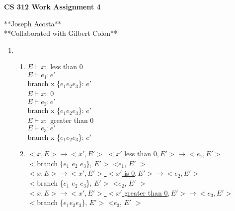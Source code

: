 \documentclass[11pt]{article}
\begin{document}
\begin{center}             %
\begin{LARGE}
{\bf CS 312 Work Assignment 4}
\end{LARGE}
\vskip 0.25cm      %

**Joseph Acosta**\\
**Collaborated with Gilbert Colon**\\
\end{center}

\begin{enumerate}

\item 
\begin{enumerate}
\item $E\vdash x:$ less than 0\\
	  \underline{$E\vdash e_1: e'$}\\
	  branch x \{$e_1 e_2 e_3$\}: $e'$\\
	  
	  $E\vdash x:$ 0\\
	  \underline{$E\vdash e_2: e'$}\\
	  branch x \{$e_1 e_2 e_3$\}: $e'$\\
	  
	  $E\vdash x:$ greater than 0\\
	  \underline{$E\vdash e_3: e'$}\\
	  branch x \{$e_1 e_2 e_3$\}: $e'$\\
	  
\item \underline{$<x,E> \to <x',E'>$\hspace{12}  $<x'$ less than 0$, E'> \to <e_1, E'>$}\\
	  $<$branch \{$e_1$ $e_2$ $e_3$\}, $E'>$ \to <$e_1$, $E'$ $>$ \\
	  
	  \underline{$<x,E> \to <x',E'>$\hspace{12}  $<x'$ is 0$, E'> \to <e_2, E'>$}\\
	  $<$branch \{$e_1$ $e_2$ $e_3$\}, $E'>$ \to <$e_2$, $E'$ $>$\\
	  
	  \underline{$<x,E> \to <x',E'>$\hspace{12}  $<x'$ greater than 0$, E'> \to <e_3, E'>$}\\
	  $<$branch \{$e_1 e_2 e_3$\}, $E'>$ \to <$e_3$, $E'$ $>$\\


\end{enumerate}


\end{enumerate}
\end{document}
